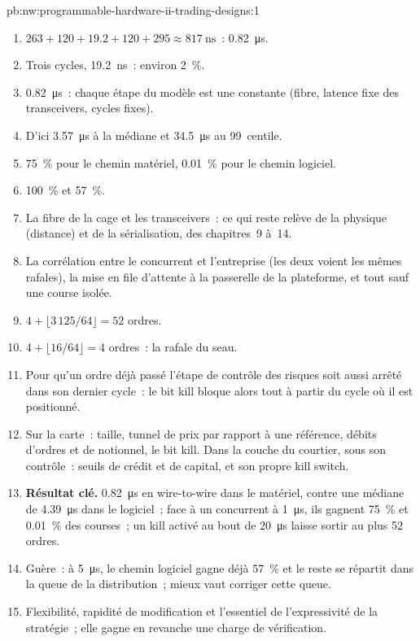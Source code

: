 \begin{solution}{pb:nw:programmable-hardware-ii-trading-designs:1}
\begin{enumerate}
\item $263 + 120 + 19.2 + 120 + 295 \approx \qty{817}{\nano\second}$~: \qty{0.82}{\micro\second}.
\item Trois cycles, \qty{19.2}{\nano\second}~: environ 2~\%.
\item \qty{0.82}{\micro\second}~: chaque étape du modèle est une constante (fibre, latence fixe des transceivers, cycles fixes).
\item D'ici \qty{3.57}{\micro\second} à la médiane et \qty{34.5}{\micro\second} au 99~centile.
\item 75~\% pour le chemin matériel, 0.01~\% pour le chemin logiciel.
\item 100~\% et 57~\%.
\item La fibre de la cage et les transceivers~: ce qui reste relève de la physique (distance) et de la sérialisation, des chapitres~9 à~14.
\item La corrélation entre le concurrent et l'entreprise (les deux voient les mêmes rafales), la mise en file d'attente à la passerelle de la plateforme, et tout sauf une course isolée.
\item $4 + \lfloor 3\,125/64\rfloor = 52$ ordres.
\item $4 + \lfloor 16/64\rfloor = 4$ ordres~: la rafale du seau.
\item Pour qu'un ordre déjà passé l'étape de contrôle des risques soit aussi arrêté dans son dernier cycle~: le bit kill bloque alors tout à partir du cycle où il
  est positionné.
\item Sur la carte~: taille, tunnel de prix par rapport à une référence, débits d'ordres et de notionnel, le bit kill. Dans la couche du courtier, sous son contrôle~:
  seuils de crédit et de capital, et son propre kill switch.
\item \textbf{Résultat clé.} \qty{0.82}{\micro\second} en wire-to-wire dans le matériel, contre une médiane de \qty{4.39}{\micro\second} dans le logiciel~; face à un
  concurrent à \qty{1}{\micro\second}, ils gagnent 75~\% et 0.01~\% des courses~; un kill activé au bout de \qty{20}{\micro\second} laisse sortir au plus 52 ordres.
\item Guère~: à \qty{5}{\micro\second}, le chemin logiciel gagne déjà 57~\% et le reste se répartit dans la queue de la distribution~; mieux vaut corriger cette queue.
\item Flexibilité, rapidité de modification et l'essentiel de l'expressivité de la stratégie~; elle gagne en revanche une charge de vérification.

\end{enumerate}
\end{solution}
